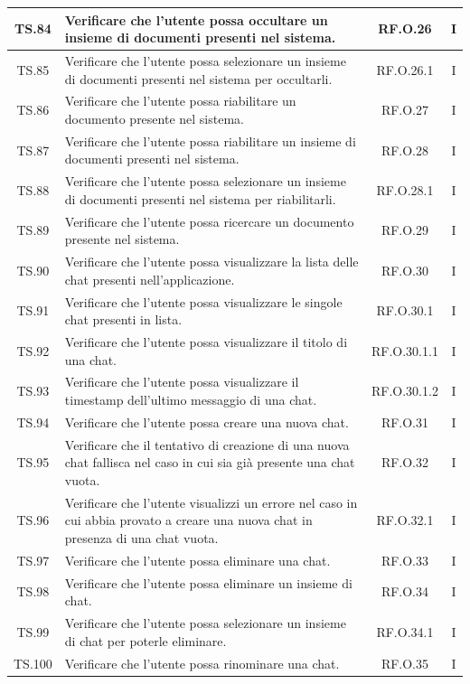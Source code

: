\begin{xltabular}{\textwidth}{|c|X|c|c|}
\hline
TS.84 & Verificare che l'utente possa occultare un insieme di documenti presenti nel sistema. & RF.O.26 & I \\
\hline
TS.85 & Verificare che l'utente possa selezionare un insieme di documenti presenti nel sistema per occultarli. & RF.O.26.1 & I \\
\hline
TS.86 & Verificare che l'utente possa riabilitare un documento presente nel sistema. & RF.O.27 & I \\
\hline
TS.87 & Verificare che l'utente possa riabilitare un insieme di documenti presenti nel sistema. & RF.O.28 & I \\
\hline
TS.88 & Verificare che l'utente possa selezionare un insieme di documenti presenti nel sistema per riabilitarli. & RF.O.28.1 & I \\
\hline
TS.89 & Verificare che l'utente possa ricercare un documento presente nel sistema. & RF.O.29 & I \\
\hline
TS.90 & Verificare che l'utente possa visualizzare la lista delle chat presenti nell’applicazione. & RF.O.30 & I \\
\hline
TS.91 & Verificare che l'utente possa visualizzare le singole chat presenti in lista. & RF.O.30.1 & I \\
\hline
TS.92 & Verificare che l'utente possa visualizzare il titolo di una chat. & RF.O.30.1.1 & I \\
\hline
TS.93 & Verificare che l'utente possa visualizzare il timestamp dell’ultimo messaggio di una chat. & RF.O.30.1.2 & I \\
\hline
TS.94 & Verificare che l'utente possa creare una nuova chat. & RF.O.31 & I \\
\hline
TS.95 & Verificare che il tentativo di creazione di una nuova chat fallisca nel caso in cui sia già presente una chat vuota. & RF.O.32 & I \\
\hline
TS.96 & Verificare che l'utente visualizzi un errore nel caso in cui abbia provato a creare una nuova chat in presenza di una chat vuota. & RF.O.32.1 & I \\
\hline
TS.97 & Verificare che l'utente possa eliminare una chat. & RF.O.33 & I \\
\hline
TS.98 & Verificare che l'utente possa eliminare un insieme di chat. & RF.O.34 & I \\
\hline
TS.99 & Verificare che l'utente possa selezionare un insieme di chat per poterle eliminare. & RF.O.34.1 & I \\
\hline
TS.100 & Verificare che l'utente possa rinominare una chat. & RF.O.35 & I \\

\end{xltabular}
